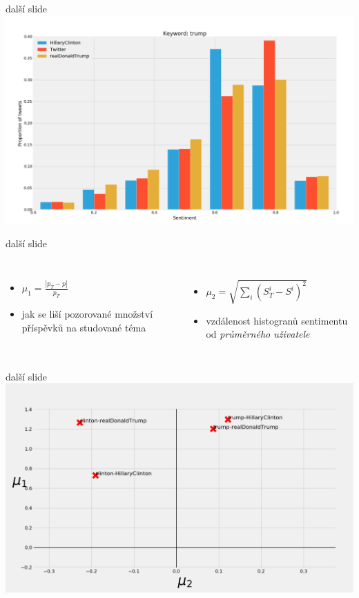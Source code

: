 \documentclass[notheorems,12pt]{beamer}
\begin{document}
\begin{frame}{další slide}
    \centering
    \includegraphics[scale=0.25]{./Pics/hist-trump.png}
\end{frame}
\begin{frame}{další slide}
    \begin{columns}
    \column{5.5cm}
        \begin{itemize}
            \item $\mu_1 = \frac{|p_T - p|}{p_T}$
            \item jak se liší pozorované množství příspěvků na studované téma
        \end{itemize}
    \column{5.5cm}
    \begin{itemize}
        \item $\mu_2 = \sqrt{\sum_{i}{\left(S_T^i - S^i\right)^2}}$
        \item vzdálenost histogranů sentimentu od \textit{průměrného uživatele}
    \end{itemize}
    \end{columns}
\end{frame}
\begin{frame}{další slide}
    \center
    \includegraphics[scale=0.30]{./Pics/measure.png}
\end{frame}
\end{document}
